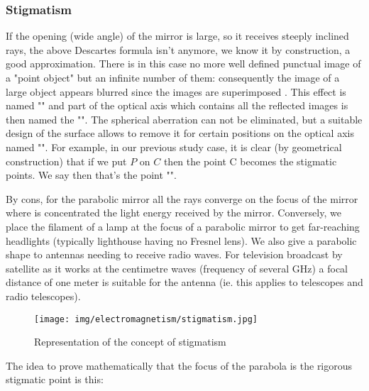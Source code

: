 	\subsubsection{Stigmatism}
	If the opening (wide angle) of the mirror is large, so it receives steeply inclined rays, the above Descartes formula isn't anymore, we know it by construction, a good approximation. There is in this case no more well defined punctual image of a "point object" but an infinite number of them: consequently the image of a large object appears blurred since the images are superimposed . This effect is named "" and part of the optical axis which contains all the reflected images is then named the "". The spherical aberration can not be eliminated, but a suitable design of the surface allows to remove it for certain positions on the optical axis named "". For example, in our previous study case, it is clear (by geometrical construction) that if we put $P$ on $C$ then the point C becomes the stigmatic points. We say then that's the point "".
	
	By cons, for the parabolic mirror all the rays converge on the focus of the mirror where is concentrated the light energy received by the mirror. Conversely, we place the filament of a lamp at the focus of a parabolic mirror to get far-reaching headlights (typically lighthouse having no Fresnel lens). We also give a parabolic shape to antennas needing to receive radio waves. For television broadcast by satellite as it works at the centimetre waves (frequency of several GHz) a focal distance of one meter is suitable for the antenna (ie. this applies to telescopes and radio telescopes).
	
	\begin{figure}[H]
		\centering
		\texttt{[image: img/electromagnetism/stigmatism.jpg]}
		\caption{Representation of the concept of stigmatism}
	\end{figure}
	The idea to prove mathematically that the focus of the parabola is the rigorous stigmatic point is this:


